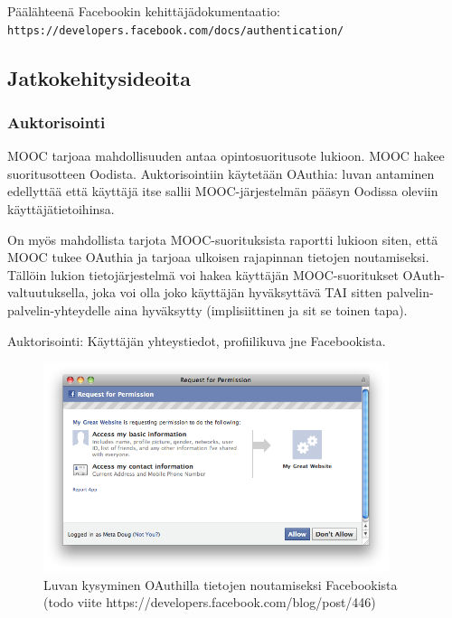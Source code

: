 \documentclass[finnish,gradu]{tktltiki}
\begin{document}
  Päälähteenä Facebookin kehittäjädokumentaatio:
  \\ \verb!https://developers.facebook.com/docs/authentication/!


  \subsection{Jatkokehitysideoita} %
  \label{sub:jatkokehitysideoita}

  \subsubsection{Auktorisointi} %
  \label{ssub:jatkokehitysideoita_auktorisointi}
  MOOC tarjoaa mahdollisuuden antaa opintosuoritusote lukioon. MOOC hakee suoritusotteen Oodista. Auktorisointiin käytetään OAuthia: luvan antaminen edellyttää että käyttäjä itse sallii MOOC-järjestelmän pääsyn Oodissa oleviin käyttäjätietoihinsa.

  On myös mahdollista tarjota MOOC-suorituksista raportti lukioon siten, että MOOC tukee OAuthia ja tarjoaa ulkoisen rajapinnan tietojen noutamiseksi. Tällöin lukion tietojärjestelmä voi hakea käyttäjän MOOC-suoritukset OAuth-valtuutuksella, joka voi olla joko käyttäjän hyväksyttävä TAI sitten palvelin-palvelin-yhteydelle aina hyväksytty (implisiittinen ja sit se toinen tapa).

  Auktorisointi: Käyttäjän yhteystiedot, profiilikuva jne Facebookista.

  \begin{figure}
    \centering
    \includegraphics[width=0.9\textwidth]{images/facebook_authorization_contact_info.png}
    \caption{Luvan kysyminen OAuthilla tietojen noutamiseksi Facebookista (todo viite https://developers.facebook.com/blog/post/446)}
    \label{fig:yleiskuva}
  \end{figure}
\end{document}

